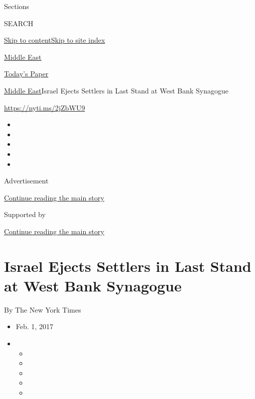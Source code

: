 Sections

SEARCH

\protect\hyperlink{site-content}{Skip to
content}\protect\hyperlink{site-index}{Skip to site index}

\href{https://www.nytimes.com/section/world/middleeast}{Middle East}

\href{https://myaccount.nytimes.com/auth/login?response_type=cookie\&client_id=vi}{}

\href{https://www.nytimes.com/section/todayspaper}{Today's Paper}

\href{/section/world/middleeast}{Middle East}\textbar{}Israel Ejects
Settlers in Last Stand at West Bank Synagogue

\url{https://nyti.ms/2jZbWU9}

\begin{itemize}
\item
\item
\item
\item
\item
\end{itemize}

Advertisement

\protect\hyperlink{after-top}{Continue reading the main story}

Supported by

\protect\hyperlink{after-sponsor}{Continue reading the main story}

\hypertarget{israel-ejects-settlers-in-last-stand-at-west-bank-synagogue}{%
\section{Israel Ejects Settlers in Last Stand at West Bank
Synagogue}\label{israel-ejects-settlers-in-last-stand-at-west-bank-synagogue}}

By The New York Times

\begin{itemize}
\item
  Feb. 1, 2017
\item
  \begin{itemize}
  \item
  \item
  \item
  \item
  \item
  \end{itemize}
\end{itemize}

